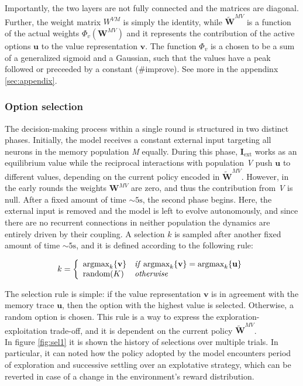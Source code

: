 \noindent Importantly, the two layers are not fully connected and the matrices are diagonal. Further, the weight matrix $W^{VM}$ is simply the identity, while $\tilde{\textbf{W}}^{MV}$ is a function of the actual weights $\Phi_{v}(\textbf{W}^{MV})$ and it represents the contribution of the active options $\textbf{u}$ to the value representation $\textbf{v}$.
The function $\Phi_{v}$ is a chosen to be a sum of a generalized sigmoid and a Gaussian, such that the values have a peak followed or preceeded by a constant (\#improve). See more in the appendinx \ref{sec:appendix}.

\subsubsection{Option selection}
The decision-making process within a single round is structured in two distinct phases. Initially, the model receives a constant external input targeting all neurons in the memory population \textit{M} equally.
During this phase, $\textbf{I}_{\text{ext}}$ works as an equilibrium value while the reciprocal interactions with population \textit{V} push $\textbf{u}$ to different values, depending on the current policy encoded in $\tilde{\textbf{W}}^{MV}$. However, in the early rounds the weights $\textbf{W}^{MV}$ are zero, and thus
the contribution from \textit{V} is null. After a fixed amount of time $\sim 5 \text{s}$, the second phase begins. Here, the external input is removed and the model is left to evolve autonomously, and since there are no recurrent connections in neither population the dynamics are entirely driven by their coupling. A selection $k$ is sampled after another fixed amount of time $\sim 5 \text{s}$, and it is defined according to the following rule:

\begin{equation*}
    k =
    \left\{
        \begin{array}{ll}
            \text{argmax}_{k}\{\textbf{v}\} & \text{\textit{if}}\; \text{argmax}_{k} \{\textbf{v}\} = \text{argmax}_{k} \{\textbf{u}\} \\
            \text{random}(K) & \text{\textit{otherwise}}
        \end{array}
    \right.
\end{equation*}

\noindent The selection rule is simple: if the value representation $\textbf{v}$ is in agreement with the memory trace $\textbf{u}$, then the option with the highest value is selected. Otherwise, a random option is chosen. This rule is a way to express the exploration-exploitation trade-off, and it
is dependent on the current policy $\tilde{\textbf{W}}^{MV}$. \\ In figure \ref{fig:sel1} it is shown the history of selections over multiple trials. In particular, it can noted how the policy adopted by the model encounters period of exploration and successive settling over an explotative strategy, which can be reverted in case of a change in the environment's reward distribution.

